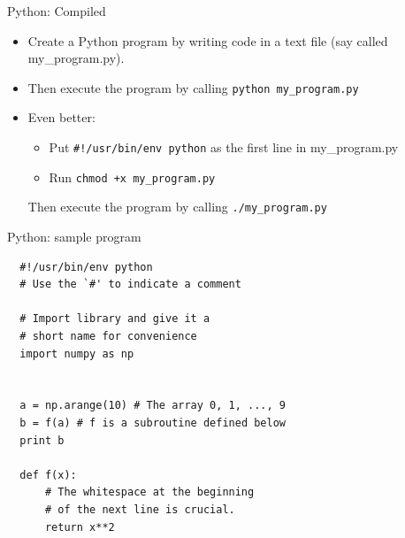 \documentclass{beamer}
\begin{document}
\begin{frame}{Python: Compiled}
  \begin{itemize}

  \item {Create a Python program by writing code in a text file (say called my\_program.py).}
  \item {Then execute the program by calling \alert{\texttt{python~my\_program.py}}}
  
  \item {Even better:
  \begin{itemize}
   \item Put \alert{\texttt{\#!/usr/bin/env~python}} as the first line in my\_program.py
   \item Run \alert{\texttt{chmod +x~my\_program.py}}
  \end{itemize}
  Then execute the program by calling \alert{\texttt{./my\_program.py}}}
  \end{itemize}
\end{frame}

\begin{frame}[fragile]{Python: sample program}
  \begin{lstlisting}
  #!/usr/bin/env python
  # Use the `#' to indicate a comment
  
  # Import library and give it a 
  # short name for convenience
  import numpy as np
  
  
  a = np.arange(10) # The array 0, 1, ..., 9
  b = f(a) # f is a subroutine defined below
  print b
  
  def f(x): 
      # The whitespace at the beginning
      # of the next line is crucial.
      return x**2 
  
  
  
  
  \end{lstlisting}

\end{frame}
\end{document}
